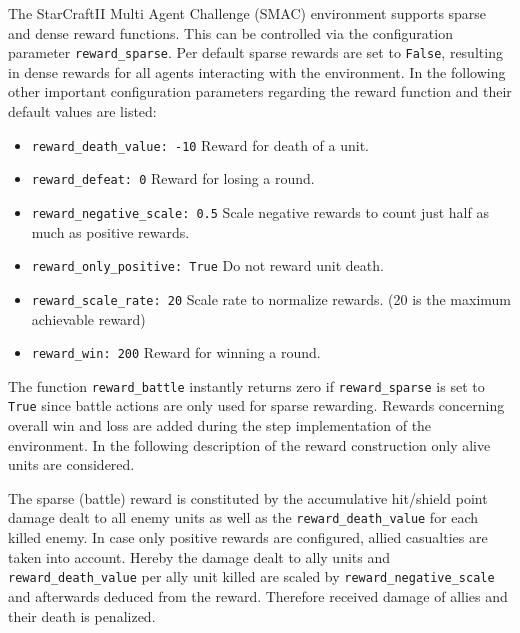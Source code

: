 The StarCraftII Multi Agent Challenge (SMAC) environment supports sparse and dense reward functions. This can be controlled via the configuration parameter \verb|reward_sparse|. Per default sparse rewards are set to \verb|False|, resulting in dense rewards for all agents interacting with the environment. In the following other important configuration parameters regarding the reward function and their default values are listed:
\begin{itemize}
	  
	\item \verb|reward_death_value: -10|
	\newline Reward for death of a unit.
	
	\item \verb|reward_defeat: 0|
	\newline Reward for losing a round.
	
	\item \verb|reward_negative_scale: 0.5|
	\newline Scale negative rewards to count just half as much as positive rewards.
	
	\item \verb|reward_only_positive: True|
	\newline Do not reward unit death. %
		
	\item \verb|reward_scale_rate: 20|
	\newline Scale rate to normalize rewards. (20 is the maximum achievable reward)
	
	\item \verb|reward_win: 200|
	\newline Reward for winning a round.
	
\end{itemize}

The function \verb|reward_battle| instantly returns zero if \verb|reward_sparse| is set to \verb|True| since battle actions are only used for sparse rewarding. Rewards concerning overall win and loss are added during the step implementation of the environment. In the following description of the reward construction only alive units are considered.

The sparse (battle) reward is constituted by the accumulative hit/shield point damage dealt to 
all enemy units as well as the \verb|reward_death_value| for each killed enemy.
In case only positive rewards are configured, allied casualties are taken into account. Hereby the damage dealt to ally units and \verb|reward_death_value| per ally unit killed are scaled by \verb|reward_negative_scale| and afterwards deduced from the reward. Therefore received damage of allies and their death is penalized.

